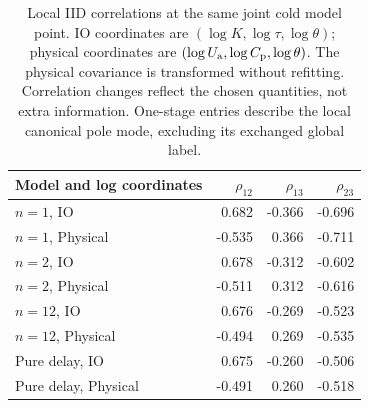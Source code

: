 \begin{table}[tbp]
\centering
\small
\begin{tabular}{lrrr}
\toprule
Model and log coordinates & $\rho_{12}$ & $\rho_{13}$ & $\rho_{23}$ \\
\midrule
$n=1$, IO & 0.682 & -0.366 & -0.696 \\
$n=1$, Physical & -0.535 & 0.366 & -0.711 \\
$n=2$, IO & 0.678 & -0.312 & -0.602 \\
$n=2$, Physical & -0.511 & 0.312 & -0.616 \\
$n=12$, IO & 0.676 & -0.269 & -0.523 \\
$n=12$, Physical & -0.494 & 0.269 & -0.535 \\
Pure delay, IO & 0.675 & -0.260 & -0.506 \\
Pure delay, Physical & -0.491 & 0.260 & -0.518 \\
\bottomrule
\end{tabular}
\caption{Local IID correlations at the same joint cold model point. IO coordinates are $(\log K,\log\tau,\log\theta)$; physical coordinates are $(\log U_{\mathrm a},\log C_{\mathrm p},\log\theta)$. The physical covariance is transformed without refitting. Correlation changes reflect the chosen quantities, not extra information. One-stage entries describe the local canonical pole mode, excluding its exchanged global label.}
\label{tab:coordinate-correlations}
\end{table}
